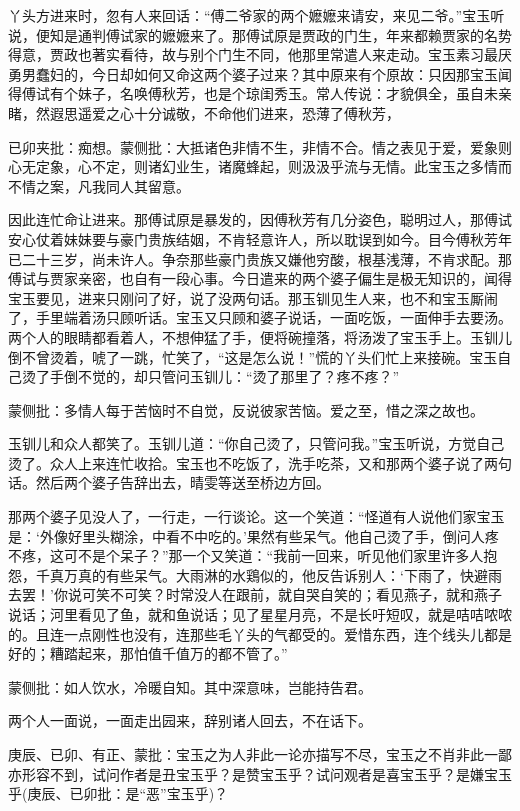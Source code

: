 \begin{parag}
    丫头方进来时，忽有人来回话：“傅二爷家的两个嬷嬷来请安，来见二爷。”宝玉听说，便知是通判傅试家的嬷嬷来了。那傅试原是贾政的门生，年来都赖贾家的名势得意，贾政也著实看待，故与别个门生不同，他那里常遣人来走动。宝玉素习最厌勇男蠢妇的，今日却如何又命这两个婆子过来？其中原来有个原故：只因那宝玉闻得傅试有个妹子，名唤傅秋芳，也是个琼闺秀玉。常人传说：才貌俱全，虽自未亲睹，然遐思遥爱之心十分诚敬，不命他们进来，恐薄了傅秋芳，\begin{note}已卯夹批：痴想。蒙侧批：大抵诸色非情不生，非情不合。情之表见于爱，爱象则心无定象，心不定，则诸幻业生，诸魔蜂起，则汲汲乎流与无情。此宝玉之多情而不情之案，凡我同人其留意。\end{note}因此连忙命让进来。那傅试原是暴发的，因傅秋芳有几分姿色，聪明过人，那傅试安心仗着妹妹要与豪门贵族结姻，不肯轻意许人，所以耽误到如今。目今傅秋芳年已二十三岁，尚未许人。争奈那些豪门贵族又嫌他穷酸，根基浅薄，不肯求配。那傅试与贾家亲密，也自有一段心事。今日遣来的两个婆子偏生是极无知识的，闻得宝玉要见，进来只刚问了好，说了没两句话。那玉钏见生人来，也不和宝玉厮闹了，手里端着汤只顾听话。宝玉又只顾和婆子说话，一面吃饭，一面伸手去要汤。两个人的眼睛都看着人，不想伸猛了手，便将碗撞落，将汤泼了宝玉手上。玉钏儿倒不曾烫着，唬了一跳，忙笑了，“这是怎么说！”慌的丫头们忙上来接碗。宝玉自己烫了手倒不觉的，却只管问玉钏儿：“烫了那里了？疼不疼？”\begin{note}蒙侧批：多情人每于苦恼时不自觉，反说彼家苦恼。爱之至，惜之深之故也。\end{note}玉钏儿和众人都笑了。玉钏儿道：“你自己烫了，只管问我。”宝玉听说，方觉自己烫了。众人上来连忙收拾。宝玉也不吃饭了，洗手吃茶，又和那两个婆子说了两句话。然后两个婆子告辞出去，晴雯等送至桥边方回。
\end{parag}


\begin{parag}
    那两个婆子见没人了，一行走，一行谈论。这一个笑道：“怪道有人说他们家宝玉是：‘外像好里头糊涂，中看不中吃的。’果然有些呆气。他自己烫了手，倒问人疼不疼，这可不是个呆子？”那一个又笑道：“我前一回来，听见他们家里许多人抱怨，千真万真的有些呆气。大雨淋的水鶏似的，他反告诉别人：‘下雨了，快避雨去罢！’你说可笑不可笑？时常没人在跟前，就自哭自笑的；看见燕子，就和燕子说话；河里看见了鱼，就和鱼说话；见了星星月亮，不是长吁短叹，就是咭咭哝哝的。且连一点刚性也没有，连那些毛丫头的气都受的。爱惜东西，连个线头儿都是好的；糟踏起来，那怕值千值万的都不管了。”\begin{note}蒙侧批：如人饮水，冷暖自知。其中深意味，岂能持告君。\end{note}两个人一面说，一面走出园来，辞别诸人回去，不在话下。\begin{note}庚辰、已卯、有正、蒙批：宝玉之为人非此一论亦描写不尽，宝玉之不肖非此一鄙亦形容不到，试问作者是丑宝玉乎？是赞宝玉乎？试问观者是喜宝玉乎？是嫌宝玉乎(庚辰、已卯批：是“恶”宝玉乎)？\end{note}
\end{parag}


